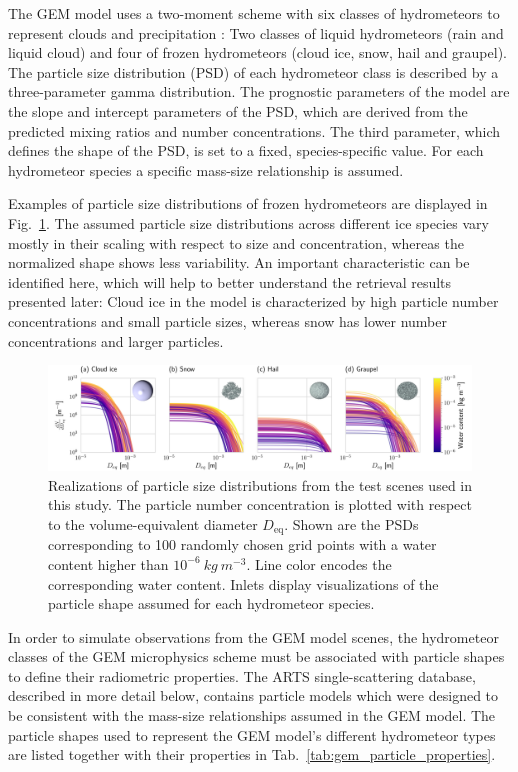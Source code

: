\documentclass[journal abbreviation, manuscript]{copernicus}
\begin{document}
The GEM model uses a two-moment scheme with six classes of hydrometeors to
represent clouds and precipitation \citep{milbrandtyau05}: Two classes of liquid
hydrometeors (rain and liquid cloud) and four of frozen hydrometeors (cloud ice,
snow, hail and graupel). The particle size distribution (PSD) of each
hydrometeor class is described by a three-parameter gamma distribution. The
prognostic parameters of the model are the slope and intercept parameters of the
PSD, which are derived from the predicted mixing ratios and number
concentrations. The third parameter, which defines the shape of the PSD, is set
to a fixed, species-specific value. For each hydrometeor species a specific
mass-size relationship is assumed.

Examples of particle size distributions of frozen hydrometeors are displayed in
Fig.~\ref{fig:gem_psds}. The assumed particle size distributions across
different ice species vary mostly in their scaling with respect to size and
concentration, whereas the normalized shape shows less variability. An important
characteristic can be identified here, which will help to better understand the
retrieval results presented later: Cloud ice in the model is characterized by
high particle number concentrations and small particle sizes, whereas snow has
lower number concentrations and larger particles.


\begin{figure}[h!]
\centering \includegraphics[width = \textwidth]{../plots/gem_psds.png}
\caption{Realizations of particle size distributions from the test scenes used
  in this study. The particle number concentration is plotted with respect to
  the volume-equivalent diameter $D_\text{eq}$. Shown are the PSDs corresponding
  to 100 randomly chosen grid points with a water content higher than
  $10^{-6}\ \unit{kg\ m^{-3}}$. Line color encodes the corresponding water
  content. Inlets display visualizations of the particle shape assumed for each
  hydrometeor species.}
\label{fig:gem_psds}
\end{figure}

In order to simulate observations from the GEM model scenes, the hydrometeor
classes of the GEM microphysics scheme must be associated with particle shapes
to define their radiometric properties. The ARTS single-scattering database,
described in more detail below, contains particle models which were designed to
be consistent with the mass-size relationships assumed in the GEM model. The
particle shapes used to represent the GEM model's different hydrometeor types
are listed together with their properties in
Tab.~\ref{tab:gem_particle_properties}.
\end{document}
